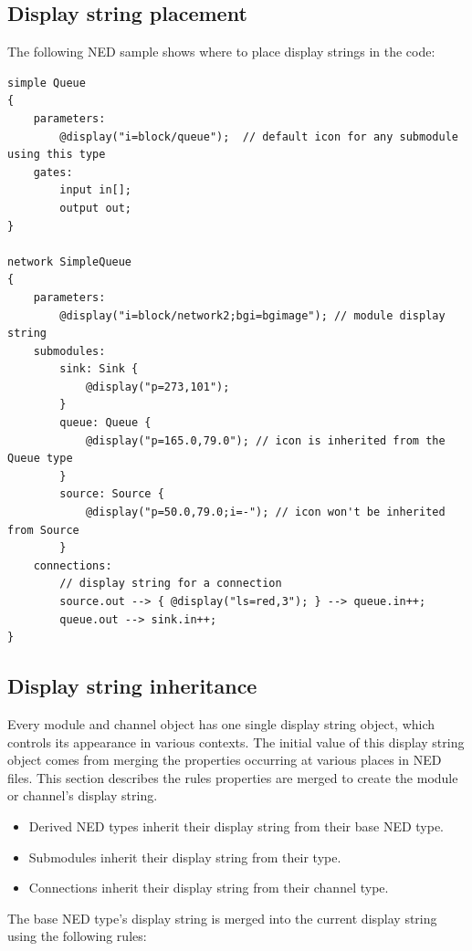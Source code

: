 \subsection{Display string placement}

The following NED sample shows where to place display strings in the code:

\begin{verbatim}
simple Queue
{
    parameters:
        @display("i=block/queue");  // default icon for any submodule using this type
    gates:
        input in[];
        output out;
}

network SimpleQueue
{
    parameters:
        @display("i=block/network2;bgi=bgimage"); // module display string
    submodules:
        sink: Sink {
            @display("p=273,101");
        }
        queue: Queue {
            @display("p=165.0,79.0"); // icon is inherited from the Queue type
        }
        source: Source {
            @display("p=50.0,79.0;i=-"); // icon won't be inherited from Source
        }
    connections:
        // display string for a connection
        source.out --> { @display("ls=red,3"); } --> queue.in++;
        queue.out --> sink.in++;
}
\end{verbatim}

\subsection{Display string inheritance}

Every module and channel object has one single display string object,
which controls its appearance in various contexts. The initial value of
this display string object comes from merging the 
properties occurring at various places in NED files.
This section describes the rules  properties are merged
to create the module or channel's display string.

\begin{itemize}
  \item Derived NED types inherit their display string from their base NED type.
  \item Submodules inherit their display string from their type.
  \item Connections inherit their display string from their channel type.
\end{itemize}

The base NED type's display string is merged into the current display string
using the following rules:

